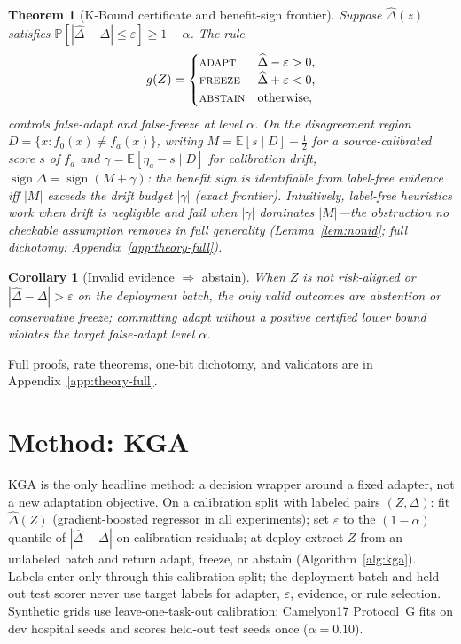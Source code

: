 \documentclass[11pt]{article}
\theoremstyle{plain}
\newtheorem{theorem}{Theorem}
\newtheorem{corollary}{Corollary}
\theoremstyle{definition}
\theoremstyle{remark}
\newcommand{\E}{\mathbb{E}}
\renewcommand{\Pr}{\mathbb{P}}
\newcommand{\sign}{\operatorname{sign}}
\begin{document}
\begin{theorem}[K-Bound certificate and benefit-sign frontier]\label{thm:headline}
Suppose $\widehat\Delta(z)$ satisfies $\Pr[|\widehat\Delta-\Delta|\le\varepsilon]\ge1-\alpha$.
The rule
\[
g(Z)=\begin{cases}
\textsc{adapt} & \widehat\Delta-\varepsilon>0,\\
\textsc{freeze} & \widehat\Delta+\varepsilon<0,\\
\textsc{abstain} & \text{otherwise},
\end{cases}
\]
controls false-adapt and false-freeze at level $\alpha$.
On the disagreement region $D=\{x:f_0(x)\neq f_a(x)\}$, writing
$M=\E[s\mid D]-\tfrac12$ for a source-calibrated score $s$ of $f_a$ and
$\gamma=\E[\eta_a-s\mid D]$ for calibration drift,
$\sign\Delta=\sign(M+\gamma)$: the benefit sign is identifiable from label-free
evidence iff $|M|$ exceeds the drift budget $|\gamma|$ (exact frontier).
Intuitively, label-free heuristics work when drift is negligible and fail when
$|\gamma|$ dominates $|M|$---the obstruction no checkable assumption removes in full
generality (Lemma~\ref{lem:nonid}; full dichotomy: Appendix~\ref{app:theory-full}).
\end{theorem}

\begin{corollary}[Invalid evidence $\Rightarrow$ abstain]\label{cor:abstain-valid}
When $Z$ is not risk-aligned or $|\widehat\Delta-\Delta|>\varepsilon$ on the deployment
batch, the only valid outcomes are abstention or conservative freeze; committing adapt
without a positive certified lower bound violates the target false-adapt level $\alpha$.
\end{corollary}

Full proofs, rate theorems, one-bit dichotomy, and validators are in
Appendix~\ref{app:theory-full}.

\section{Method: \textsc{KGA}}\label{sec:method}
\textsc{KGA} is the only headline method: a decision wrapper around a fixed adapter, not a new
adaptation objective. On a calibration split with labeled pairs $(Z,\Delta)$: fit
$\widehat\Delta(Z)$ (gradient-boosted regressor in all experiments); set
$\varepsilon$ to the $(1-\alpha)$ quantile of $|\widehat\Delta-\Delta|$ on calibration
residuals; at deploy extract $Z$ from an unlabeled batch and return adapt, freeze, or abstain
(Algorithm~\ref{alg:kga}). Labels enter only through this calibration split; the deployment
batch and held-out test scorer never use target labels for adapter, $\varepsilon$, evidence,
or rule selection. Synthetic grids use leave-one-task-out calibration; Camelyon17
Protocol~G fits on dev hospital seeds and scores held-out test seeds once ($\alpha{=}0.10$).
\end{document}
